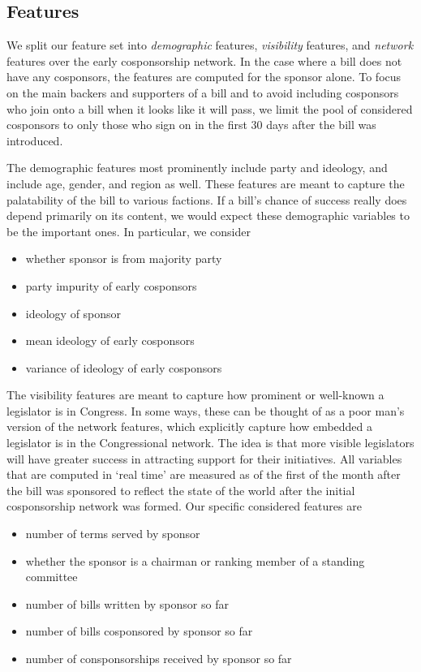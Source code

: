 \subsection{Features}

We split our feature set into \textit{demographic} features, \textit{visibility}
features, and \textit{network} features over the early cosponsorship network. In
the case where a bill does not have any cosponsors, the features are computed
for the sponsor alone. To focus on the main backers and supporters of a bill and
to avoid including cosponsors who join onto a bill when it looks like it will
pass, we limit the pool of considered cosponsors to only those who sign on in
the first 30 days after the bill was introduced.

The demographic features most prominently include party and ideology, and
include age, gender, and region as well. These features are meant to capture the
palatability of the bill to various factions. If a bill's chance of success
really does depend primarily on its content, we would expect these demographic
variables to be the important ones. In particular, we consider
\begin{itemize}
	\item whether sponsor is from majority party
	\item party impurity of early cosponsors
	\item ideology of sponsor
	\item mean ideology of early cosponsors
	\item variance of ideology of early cosponsors
\end{itemize}

The visibility features are meant to capture how prominent or well-known a
legislator is in Congress. In some ways, these can be thought of as a poor man's
version of the network features, which explicitly capture how embedded a
legislator is in the Congressional network. The idea is that more visible
legislators will have greater success in attracting support for their
initiatives. All variables that are computed in `real time' are measured as of
the first of the month after the bill was sponsored to reflect the state of the
world after the initial cosponsorship network was formed. Our specific
considered features are
\begin{itemize}
	\item number of terms served by sponsor
	\item whether the sponsor is a chairman or ranking member of a standing committee
	\item number of bills written by sponsor so far
	\item number of bills cosponsored by sponsor so far
	\item number of consponsorships received by sponsor so far
\end{itemize}

